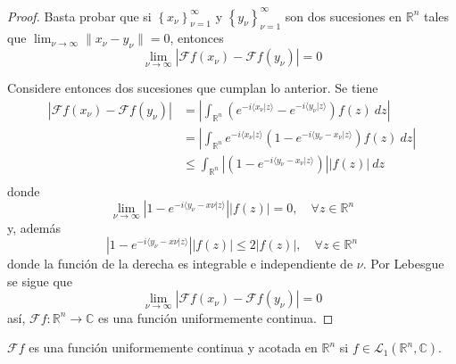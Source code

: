 \documentclass[12pt]{report}
\theoremstyle{largebreak}
\renewcommand{\leq}{\ensuremath{\leqslant}}
\newcommand\abs[1]{\ensuremath{\left|#1\right|}}
\newcommand\cf[3]{\ensuremath{#1:#2\rightarrow#3}}
\newcommand\norm[1]{\ensuremath{\|#1\|}}
\newcommand\pint[2]{\ensuremath{\langle#1| #2\rangle}}
\newcommand{\fou}[1]{\ensuremath{\mathcal{F}#1}}
\begin{document}
    \begin{proof}
        Basta probar que si $\left\{x_\nu\right\}_{ \nu=1}^\infty$ y $\left\{y_\nu \right\}_{ \nu=1}^\infty$ son dos sucesiones en $\mathbb{R}^n$ tales que $\lim_{ \nu\rightarrow\infty}\norm{x_\nu-y_\nu}=0$, entonces
        \begin{equation*}
            \lim_{\nu\rightarrow\infty}\abs{\fou{f}(x_\nu)-\fou{f}(y_\nu)}=0
        \end{equation*}

        Considere entonces dos sucesiones que cumplan lo anterior. Se tiene
        \begin{equation*}
            \begin{split}
                \abs{\fou{f}(x_\nu)-\fou{f}(y_\nu)}&=\abs{\int_{\mathbb{R}^n}\left(e^{ -i\pint{x_\nu}{z}}-e^{ -i\pint{y_\nu}{z}} \right)f(z)\:dz}\\
                &=\abs{\int_{\mathbb{R}^n}e^{ -i\pint{x_\nu}{z}}\left(1-e^{ -i\pint{y_\nu-x_\nu}{z}} \right)f(z)\:dz}\\
                &\leq\int_{\mathbb{R}^n}\abs{\left(1-e^{ -i\pint{y_\nu-x_\nu}{z}} \right)}\abs{f(z)}\:dz\\
            \end{split}
        \end{equation*}
        donde
        \begin{equation*}
            \lim_{\nu\rightarrow\infty}\abs{1-e^{-i\pint{y_\nu-x\nu}{z}}}\abs{f(z)}=0,\quad\forall z\in\mathbb{R}^n
        \end{equation*}
        y, además
        \begin{equation*}
            \abs{1-e^{-i\pint{y_\nu-x\nu}{z}}}\abs{f(z)}\leq2\abs{f(z)},\quad\forall z\in\mathbb{R}^n
        \end{equation*}
        donde la función de la derecha es integrable e independiente de $\nu$. Por Lebesgue se sigue que
        \begin{equation*}
            \lim_{\nu\rightarrow\infty}\abs{\fou{f}(x_\nu)-\fou{f}(y_\nu)}=0
        \end{equation*}
        así, $\cf{\fou{f}}{\mathbb{R}^n}{\mathbb{C}}$ es una función uniformemente continua.
    \end{proof}

    \begin{obs}
        $\fou{f}$ es una función uniformemente continua y acotada en $\mathbb{R}^n$ si $f\in\mathcal{L}_1(\mathbb{R}^n,\mathbb{C})$.
    \end{obs}
\end{document}
